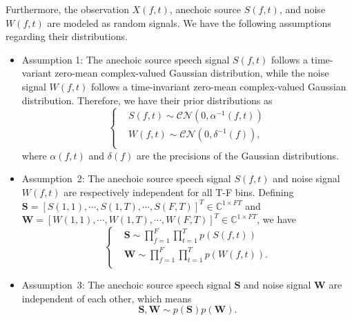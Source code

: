 
Furthermore, the observation $X(f,t)$, anechoic source $S(f,t)$, and noise $W(f,t)$ are modeled as random signals.
We have the following assumptions regarding their distributions.

\begin{itemize}
\item Assumption 1: The anechoic source speech signal $S(f,t)$ follows a time-variant zero-mean complex-valued Gaussian distribution, while the noise signal $W(f,t)$ follows a time-invariant zero-mean complex-valued Gaussian distribution. 
Therefore, we have their prior distributions as
\begin{equation}
\left\{
\begin{aligned}
    &S(f,t)\sim\mathcal{CN}\left(0,\alpha^{-1}(f,t)\right)\\
    &W(f,t)\sim\mathcal{CN}\left(0,\delta^{-1}(f)\right),\\
\end{aligned}
\right.
\end{equation}
where $\alpha(f,t)$ and $\delta(f)$ are the precisions of the Gaussian distributions.

\item Assumption~2: 
The anechoic source speech signal $S(f,t)$ and noise signal $W(f,t)$ are respectively independent for all T-F bins.
Defining $\mathbf{S}=[S(1,1),\cdots,S(1,T),\cdots,S(F,T)]^T\in \mathbb{C}^{1\times FT}$ and $\mathbf{W} = [W(1,1),\cdots,W(1,T),\cdots,W(F,T)]^T\in \mathbb{C}^{1\times FT}$, we have
\begin{equation}
\left\{
\begin{aligned}
    &\mathbf{S} \sim \prod_{f=1}^F\prod_{t=1}^T p\left(S(f,t)\right)\\
    &\mathbf{W}\sim\prod_{f=1}^F\prod_{t=1}^T p\left(W(f,t)\right).\\
\end{aligned}
\right.
\end{equation}

\item Assumption~3:
The anechoic source speech signal $\mathbf{S}$ and noise signal $\mathbf{W}$ are independent of each other, which means
\begin{equation}
    \mathbf{S},\mathbf{W} \sim p(\mathbf{S})p(\mathbf{W}).
\end{equation}

\end{itemize}

